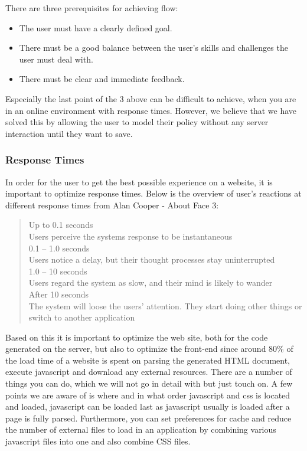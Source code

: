 There are three prerequisites for achieving flow:

\begin{itemize}

  \item The user must have a clearly defined goal.
  \item There must be a good balance between the user's skills and challenges the user must deal with.
  \item There must be clear and immediate feedback.

\end{itemize}

Especially the last point of the 3 above can be difficult to achieve, when you are in an online environment with response times. However, we believe that we have solved this by allowing the user to model their policy without any server interaction until they want to save.

\subsubsection{Response Times}
In order for the user to get the best possible experience on a website, it is important to optimize response times. Below is the overview of user's reactions at different response times from Alan Cooper - About Face 3:

\begin{quotation}
Up to 0.1 seconds
\\Users perceive the systems response to be instantaneous
\\0.1 – 1.0 seconds
\\Users notice a delay, but their thought processes stay uninterrupted
\\1.0 – 10 seconds
\\Users regard the system as slow, and their mind is likely to wander
\\After 10 seconds
\\The system will loose the users’ attention. They start doing other things or switch to another application
\end{quotation}

Based on this it is important to optimize the web site, both for the code generated on the server, but also to optimize the front-end since around 80\% of the load time \cite{responsetimes} of a website is spent on parsing the generated HTML document, execute javascript and download any external resources. There are a number of things you can do, which we will not go in detail with but just touch on. A few points we are aware of is where and in what order javascript and css is located and loaded, javascript can be loaded last as javascript usually is loaded after a page is fully parsed. Furthermore, you can set preferences for cache and reduce the number of external files to load in an application by combining various javascript files into one and also combine CSS files. 

